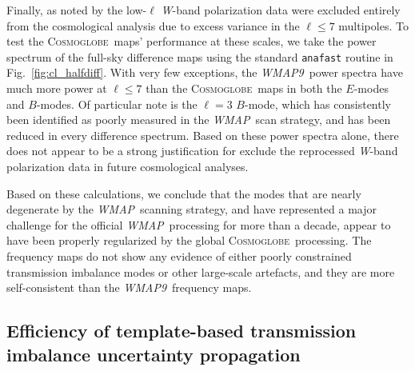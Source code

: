 \documentclass[twocolumn]{../../common/aa}
\def\WMAP{\emph{WMAP}}
\def\WMAPnine{\emph{WMAP9}}
\newcommand{\cosmoglobe}{\textsc{Cosmoglobe}}
\newcommand{\W}[0]{\textit W}
\begin{document}
Finally, as noted by \citet{jarosik2010} the low-$\ell$ \W-band polarization data were excluded entirely from the cosmological analysis due to excess variance in the $\ell\leq7$ multipoles. To test the \cosmoglobe\ maps' performance at these scales, we take the power spectrum of the full-sky difference maps using the standard \texttt{anafast} routine in Fig.~\ref{fig:cl_halfdiff}. With very few exceptions, the \WMAPnine\ power spectra have much more power at $\ell\leq7$ than the \cosmoglobe\ maps in both the $E$-modes and $B$-modes. Of particular note is the $\ell=3$ $B$-mode, which has consistently been identified as poorly measured in the \WMAP\ scan strategy, and has been reduced in every difference spectrum. Based on these power spectra alone, there does not appear to be a strong justification for exclude the reprocessed \W-band polarization data in future cosmological analyses.



Based on these calculations, we conclude that the modes that are nearly degenerate by the \WMAP\ scanning strategy, and have represented a major challenge for the official \WMAP\ processing for more than a decade, appear to have been properly regularized by the global \cosmoglobe\ processing. The frequency maps do not show any evidence of either poorly constrained transmission imbalance modes or other large-scale artefacts, and they are more self-consistent than the \WMAPnine\ frequency maps.




\subsection{Efficiency of template-based transmission imbalance uncertainty propagation}
\end{document}
